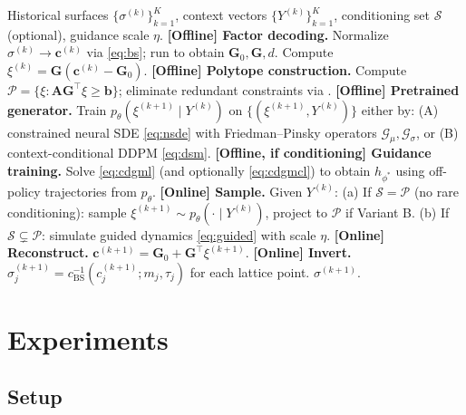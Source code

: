 \documentclass{article}
\newcommand{\1}{\mathbf{1}}
\newcommand{\cP}{\mathcal{P}}
\newcommand{\cS}{\mathcal{S}}
\newcommand{\cG}{\mathcal{G}}
\begin{document}
\begin{algorithm}[H]
\caption{Arbitrage-Free Conditional Vol Surface Forecasting}
\label{alg:main}
\begin{algorithmic}[1]
\Require Historical surfaces $\{\sigma^{(k)}\}_{k=1}^K$, context vectors $\{Y^{(k)}\}_{k=1}^K$, conditioning set $\cS$ (optional), guidance scale $\eta$.
\State \textbf{[Offline] Factor decoding.} Normalize $\sigma^{(k)} \to \mathbf{c}^{(k)}$ via \eqref{eq:bs}; run \citet[Algorithm 1]{cohen2021} to obtain $\mathbf{G}_0, \mathbf{G}, d$. Compute $\xi^{(k)} = \mathbf{G}(\mathbf{c}^{(k)} - \mathbf{G}_0)$.
\State \textbf{[Offline] Polytope construction.} Compute $\cP = \{\xi : \mathbf{A}\mathbf{G}^\top \xi \ge \mathbf{b}\}$; eliminate redundant constraints via \citet{caron1989}.
\State \textbf{[Offline] Pretrained generator.} Train $p_\theta(\xi^{(k+1)} \mid Y^{(k)})$ on $\{(\xi^{(k+1)}, Y^{(k)})\}$ either by:
  \Statex \quad (A) constrained neural SDE \eqref{eq:nsde} with Friedman--Pinsky operators $\cG_\mu, \cG_\sigma$, or
  \Statex \quad (B) context-conditional DDPM \eqref{eq:dsm}.
\State \textbf{[Offline, if conditioning] Guidance training.} Solve \eqref{eq:cdgml} (and optionally \eqref{eq:cdgmcl}) to obtain $h_{\phi^*}$ using off-policy trajectories from $p_\theta$.
\State \textbf{[Online] Sample.} Given $Y^{(k)}$:
  \Statex \quad (a) If $\cS = \cP$ (no rare conditioning): sample $\xi^{(k+1)} \sim p_\theta(\cdot \mid Y^{(k)})$, project to $\cP$ if Variant B.
  \Statex \quad (b) If $\cS \subsetneq \cP$: simulate guided dynamics \eqref{eq:guided} with scale $\eta$.
\State \textbf{[Online] Reconstruct.} $\mathbf{c}^{(k+1)} = \mathbf{G}_0 + \mathbf{G}^\top \xi^{(k+1)}$.
\State \textbf{[Online] Invert.} $\sigma^{(k+1)}_j = c_{\mathrm{BS}}^{-1}(c^{(k+1)}_j; m_j, \tau_j)$ for each lattice point.
\State \Return $\sigma^{(k+1)}$.
\end{algorithmic}
\end{algorithm}

\section{Experiments}
\label{sec:experiments}

\subsection{Setup}
\end{document}
